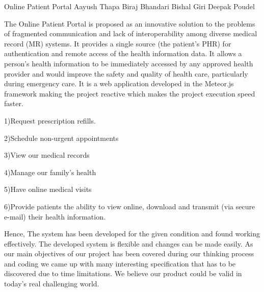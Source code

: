 \begin{conf-abstract}[]
 {Online Patient Portal }
 {Aayush Thapa
 	Biraj Bhandari
 	Bishal Giri
 	Deepak Poudel
 }
{}

The Online Patient Portal is proposed as an innovative solution to the
problems of fragmented communication and lack of interoperability among diverse medical record (MR) systems. It provides a single source (the patient’s PHR) for authentication and remote access of the health information data. It allows a person’s health information to be immediately accessed by any approved health provider and would improve the safety and quality of health care, particularly during emergency care. It is a web application developed in the Meteor.js framework making the project reactive which makes the project execution speed faster.

1)Request prescription refills.

2)Schedule non-urgent appointments

3)View our medical records

4)Manage our family's health

5)Have online medical visits

6)Provide patients the ability to view online, download and transmit (via
secure e-mail) their health information.

Hence, The system has been developed for the given condition and found working effectively. The developed system is flexible and changes can be made easily. As our main objectives of our project has been covered during our thinking process and coding we came up with many interesting specification that has to be discovered due to time limitations. We believe our product could be valid in today's real challenging world. 

 \end{conf-abstract}